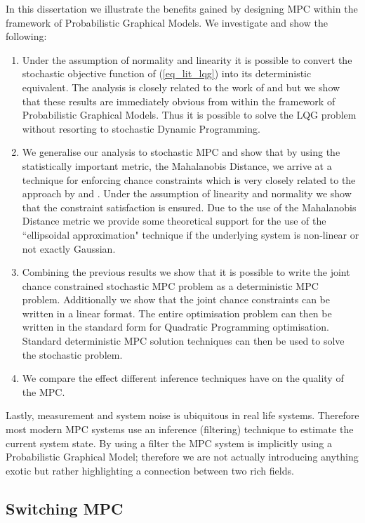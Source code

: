 In this dissertation we illustrate the benefits gained by designing MPC within the framework of Probabilistic Graphical Models. We investigate and show the following:
\begin{enumerate}
\item
Under the assumption of normality and linearity it is possible to convert the stochastic objective function of (\ref{eq_lit_lqg}) into its deterministic equivalent. The analysis is closely related to the work of  \cite{yan1} and \cite{yan2} but we show that these results are immediately obvious from within the framework of Probabilistic Graphical Models. Thus it is possible to solve the LQG problem without resorting to stochastic Dynamic Programming.
\item
We generalise our analysis to stochastic MPC and show that by using the statistically important metric, the Mahalanobis Distance, we arrive at a technique for enforcing chance constraints which is very closely related to the approach by \cite{vanhessem2} and \cite{vanhessem1}. Under the assumption of linearity and normality we show that the constraint satisfaction is ensured. Due to the use of the Mahalanobis Distance metric we provide some theoretical support for the use of the ``ellipsoidal approximation" technique if the underlying system is non-linear or not exactly Gaussian.
\item
Combining the previous results we show that it is possible to write the joint chance constrained stochastic MPC problem as a deterministic MPC problem. Additionally we show that the joint chance constraints can be written in a linear format. The entire optimisation problem can then be written in the standard form for Quadratic Programming optimisation. Standard deterministic MPC solution techniques can then be used to solve the stochastic problem.
\item
We compare the effect different inference techniques have on the quality of the MPC.
\end{enumerate}
Lastly, measurement and system noise is ubiquitous in real life systems. Therefore most modern MPC systems use an inference (filtering) technique to estimate the current system state. By using a filter the MPC system is implicitly using a Probabilistic Graphical Model; therefore we are not actually introducing anything exotic but rather highlighting a connection between two rich fields. 

\subsection{Switching MPC}
\label{sec_switch_mpc_lit}